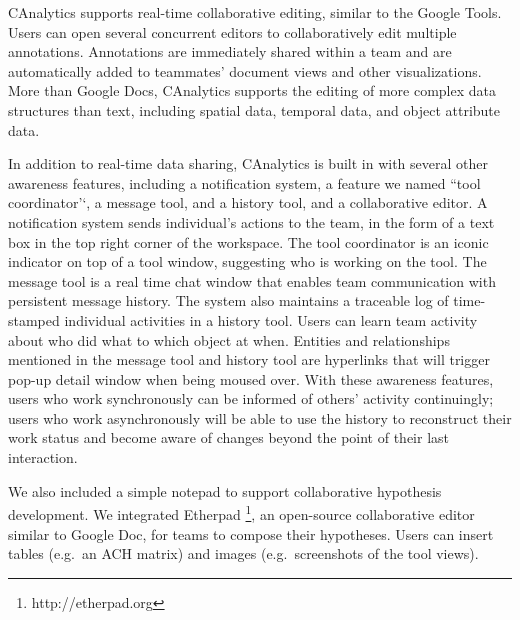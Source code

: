 CAnalytics supports real-time collaborative editing, similar to the
Google Tools. Users can open several concurrent editors to
collaboratively edit multiple annotations. Annotations are immediately
shared within a team and are automatically added to teammates' document
views and other visualizations. More than Google Docs, CAnalytics supports the editing of more complex data
structures than text, including spatial data, temporal data, and object
attribute data.

In addition to real-time data sharing, CAnalytics is built in with
several other awareness features, including a notification system, a
feature we named ``tool coordinator'`, a message tool, and a history
tool, and a collaborative editor. A notification system sends
individual's actions to the team, in the form of a text box in the top
right corner of the workspace. The tool coordinator is an iconic
indicator on top of a tool window, suggesting who is working on the
tool. The message tool is a real time chat window that enables team
communication with persistent message history. The system also maintains
a traceable log of time-stamped individual activities in a history tool.
Users can learn team activity about who did what to which object at
when. Entities and relationships mentioned in the message tool and
history tool are hyperlinks that will trigger pop-up detail window when
being moused over. With these awareness features, users who work
synchronously can be informed of others' activity continuingly; users
who work asynchronously will be able to use the history to reconstruct
their work status and become aware of changes beyond the point of their
last interaction.

We also included a simple notepad to support collaborative hypothesis
development. We integrated Etherpad \footnote{http://etherpad.org}, an
open-source collaborative editor similar to Google Doc, for teams to
compose their hypotheses. Users can insert tables (e.g.~an ACH matrix)
and images (e.g.~screenshots of the tool views).
